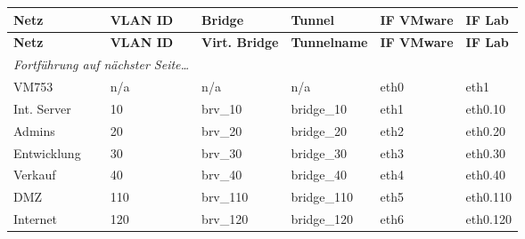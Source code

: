 \begin{longtable}{p{2.5cm}|p{2cm}|p{1.5cm}|p{2cm}|p{2.5cm}|p{2cm}}
	\textbf{Netz} & \textbf{VLAN ID} & \textbf{Bridge} & \textbf{Tunnel} & \textbf{IF VMware} & \textbf{IF Lab}\\
	\hline
	\endfirsthead
	\textbf{Netz} & \textbf{VLAN ID} & \textbf{Virt. Bridge} & \textbf{Tunnelname} & \textbf{IF VMware} & \textbf{IF Lab}\\
	\hline
	\endhead
	\hline
	\multicolumn{2}{l}{\textit{Fortführung auf nächster Seite\ldots}} \\
	\endfoot
	\endlastfoot
	VM753 & n/a & n/a & n/a & eth0 & eth1 \\
	Int. Server & 10 & brv\_10 & bridge\_10 & eth1 & eth0.10 \\
	Admins & 20 & brv\_20 & bridge\_20 & eth2 & eth0.20 \\
	Entwicklung & 30 & brv\_30 & bridge\_30 & eth3 & eth0.30 \\
	Verkauf & 40 & brv\_40 & bridge\_40 & eth4 & eth0.40 \\
	DMZ & 110 & brv\_110 & bridge\_110 & eth5 & eth0.110 \\
	Internet & 120 & brv\_120 & bridge\_120 & eth6 & eth0.120
\end{longtable}
